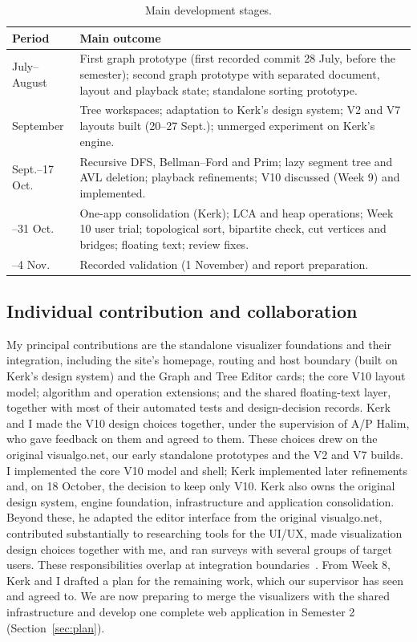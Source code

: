 \documentclass[11pt,a4paper]{article}
\begin{document}
\begin{table}[tbp]\small\centering
\caption{Main development stages.}\label{tab:timeline}
\begin{tabularx}{\linewidth}{@{}>{\raggedright\arraybackslash}p{24mm}X@{}}\toprule
Period & Main outcome\\\midrule
July--August & First graph prototype (first recorded commit 28 July, before the semester); second graph prototype with separated document, layout and playback state; standalone sorting prototype.\\
September & Tree workspaces; adaptation to Kerk's design system; V2 and V7 layouts built (20--27 Sept.); unmerged experiment on Kerk's engine.\\
29 Sept.--17 Oct. & Recursive DFS, Bellman--Ford and Prim; lazy segment tree and AVL deletion; playback refinements; V10 discussed (Week 9) and implemented.\\
18--31 Oct. & One-app consolidation (Kerk); LCA and heap operations; Week 10 user trial; topological sort, bipartite check, cut vertices and bridges; floating text; review fixes.\\
1--4 Nov. & Recorded validation (1 November) and report preparation.\\\bottomrule
\end{tabularx}
\end{table}

\subsection{Individual contribution and collaboration}
My principal contributions are the standalone visualizer foundations and their integration, including the site's homepage, routing and host boundary (built on Kerk's design system) and the Graph and Tree Editor cards; the core V10 layout model; algorithm and operation extensions; and the shared floating-text layer, together with most of their automated tests and design-decision records. Kerk and I made the V10 design choices together, under the supervision of A/P Halim, who gave feedback on them and agreed to them. These choices drew on the original visualgo.net, our early standalone prototypes and the V2 and V7 builds. I implemented the core V10 model and shell; Kerk implemented later refinements and, on 18 October, the decision to keep only V10. Kerk also owns the original design system, engine foundation, infrastructure and application consolidation. Beyond these, he adapted the editor interface from the original visualgo.net, contributed substantially to researching tools for the UI/UX, made visualization design choices together with me, and ran surveys with several groups of target users. These responsibilities overlap at integration boundaries~\cite{evidence}. From Week 8, Kerk and I drafted a plan for the remaining work, which our supervisor has seen and agreed to. We are now preparing to merge the visualizers with the shared infrastructure and develop one complete web application in Semester 2 (Section~\ref{sec:plan}).
\end{document}
